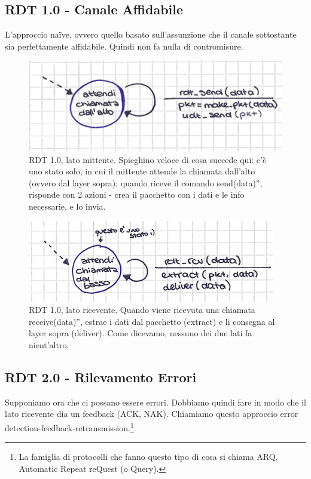 \subsection*{RDT 1.0 - Canale Affidabile}
\noindent L'approccio naïve, ovvero quello basato sull'assunzione che il canale sottostante sia perfettamente affidabile. Quindi non fa nulla di contromisure. 

\begin{figure} [ht]
    \centering
    \includegraphics[width=0.8\linewidth]{Figures/03/rdt1-0-mit.png}
    \caption{RDT 1.0, lato mittente. Spieghino veloce di cosa succede qui: c'è uno stato solo, in cui il mittente attende la chiamata dall'alto (ovvero dal layer sopra); quando riceve il comando \openapex send(data)'', risponde con 2 azioni - crea il pacchetto con i dati e le info necessarie, e lo invia.}
\end{figure}

\begin{figure} [h!]
    \centering
    \includegraphics[width=0.8\linewidth]{Figures/03/rdt1-0-rcv.png}
    \caption{RDT 1.0, lato ricevente. Quando viene ricevuta una chiamata \openapex receive(data)'', estrae i dati dal pacchetto (extract) e li consegna al layer sopra (deliver). Come dicevamo, nessuno dei due lati fa nient'altro.}
\end{figure}
\newpage

\subsection*{RDT 2.0 - Rilevamento Errori}
\noindent Supponiamo ora che ci possano essere errori. Dobbiamo quindi fare in modo che il lato ricevente dia un feedback (ACK, NAK). Chiamiamo questo approccio error detection-feedback-retransmission.\footnote{La famiglia di protocolli che fanno questo tipo di cosa si chiama ARQ, Automatic Repeat reQuest (o Query).}

